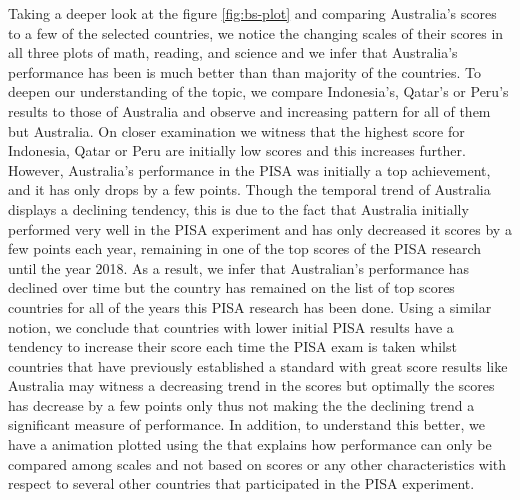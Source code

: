 Taking a deeper look at the figure \ref{fig:bs-plot} and comparing
Australia's scores to a few of the selected countries, we notice the
changing scales of their scores in all three plots of math, reading, and
science and we infer that Australia's performance has been is much
better than than majority of the countries. To deepen our understanding
of the topic, we compare Indonesia's, Qatar's or Peru's results to those
of Australia and observe and increasing pattern for all of them but
Australia. On closer examination we witness that the highest score for
Indonesia, Qatar or Peru are initially low scores and this increases
further. However, Australia's performance in the PISA was initially a
top achievement, and it has only drops by a few points. Though the
temporal trend of Australia displays a declining tendency, this is due
to the fact that Australia initially performed very well in the PISA
experiment and has only decreased it scores by a few points each year,
remaining in one of the top scores of the PISA research until the year
2018. As a result, we infer that Australian's performance has declined
over time but the country has remained on the list of top scores
countries for all of the years this PISA research has been done. Using a
similar notion, we conclude that countries with lower initial PISA
results have a tendency to increase their score each time the PISA exam
is taken whilst countries that have previously established a standard
with great score results like Australia may witness a decreasing trend
in the scores but optimally the scores has decrease by a few points only
thus not making the the declining trend a significant measure of
performance. In addition, to understand this better, we have a animation
plotted using  \citep{gganimate} the that explains
how performance can only be compared among scales and not based on
scores or any other characteristics with respect to several other
countries that participated in the PISA experiment.

